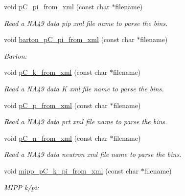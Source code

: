 \begin{DoxyCompactItemize}
\item 
void \hyperlink{class_neutrino_flux_reweight_1_1_thin_target_bins_a598ff92410904316e7a8adbe13cf4d29}{p\-C\-\_\-pi\-\_\-from\-\_\-xml} (const char $\ast$filename)
\begin{DoxyCompactList}\small\item\em Read a N\-A49 data pip xml file name to parse the bins. \end{DoxyCompactList}\item 
void \hyperlink{class_neutrino_flux_reweight_1_1_thin_target_bins_a77da9b84c54f5c105ac58a299ff127f6}{barton\-\_\-p\-C\-\_\-pi\-\_\-from\-\_\-xml} (const char $\ast$filename)
\begin{DoxyCompactList}\small\item\em Barton\-: \end{DoxyCompactList}\item 
void \hyperlink{class_neutrino_flux_reweight_1_1_thin_target_bins_a2875a9a3366316f03fff7ce3bad14648}{p\-C\-\_\-k\-\_\-from\-\_\-xml} (const char $\ast$filename)
\begin{DoxyCompactList}\small\item\em Read a N\-A49 data K xml file name to parse the bins. \end{DoxyCompactList}\item 
void \hyperlink{class_neutrino_flux_reweight_1_1_thin_target_bins_a6d08de6feef006ad2830e9c025f0b2f1}{p\-C\-\_\-p\-\_\-from\-\_\-xml} (const char $\ast$filename)
\begin{DoxyCompactList}\small\item\em Read a N\-A49 data prt xml file name to parse the bins. \end{DoxyCompactList}\item 
void \hyperlink{class_neutrino_flux_reweight_1_1_thin_target_bins_a54f0b026666387f095371c809343b2e0}{p\-C\-\_\-n\-\_\-from\-\_\-xml} (const char $\ast$filename)
\begin{DoxyCompactList}\small\item\em Read a N\-A49 data neutron xml file name to parse the bins. \end{DoxyCompactList}\item 
void \hyperlink{class_neutrino_flux_reweight_1_1_thin_target_bins_a27bed0bfedbcdbe8115b4bc6a19164c5}{mipp\-\_\-p\-C\-\_\-k\-\_\-pi\-\_\-from\-\_\-xml} (const char $\ast$filename)
\begin{DoxyCompactList}\small\item\em M\-I\-P\-P k/pi\-: \end{DoxyCompactList}\item 

\end{DoxyCompactItemize}
